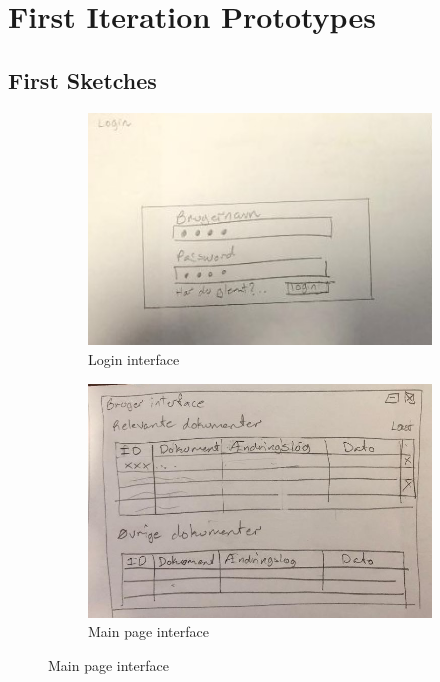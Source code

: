 \chapter{First Iteration Prototypes}\label{chap:1-Prototypes}

\section{First Sketches}\label{sec:First-sketches}
\begin{figure}[H]
		\centering
		\begin{subfigure}[b]{0.48\textwidth}
			\includegraphics[width=\textwidth]{billeder/login-view.jpg}
			\caption{Login interface}
			\label{fig:1-Login}
		\end{subfigure}
		\quad
		\begin{subfigure}[b]{0.48\textwidth}
			\includegraphics[width=\textwidth]{billeder/Main-view.jpg}
			\caption{Main page interface}
			\label{fig:1-Main}
		\end{subfigure}
\end{figure}
